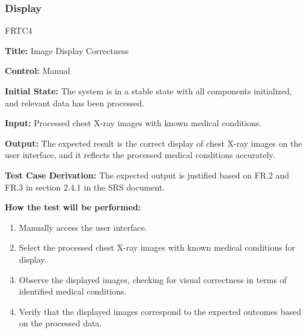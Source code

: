 \documentclass[12pt, titlepage]{article}
\begin{document}
\subsubsection{Display}
\begin{itemize}
    \begin{item}
        FRTC4
        \begin{mdframed}[linewidth=0.5mm]
            \textbf{Title:} Image Display Correctness \par
            \textbf{Control:} Manual \par
            \textbf{Initial State:} The system is in a stable state with all components initialized, and relevant data has been processed. \par
            \textbf{Input:} Processed chest X-ray images with known medical conditions. \par
            \textbf{Output:} The expected result is the correct display of chest X-ray images on the user interface, and it reflects the processed medical conditions accurately. \par
            \textbf{Test Case Derivation:} The expected output is justified based on FR.2 and FR.3 in section 2.4.1 in the SRS document. \par
            \textbf{How the test will be performed:}
            \begin{enumerate}[noitemsep]
                \item Manually access the user interface.
                \item Select the processed chest X-ray images with known medical conditions for display.
                \item Observe the displayed images, checking for visual correctness in terms of identified medical conditions.
                \item Verify that the displayed images correspond to the expected outcomes based on the processed data.
            \end{enumerate}
        \end{mdframed}
    \end{item}


\end{itemize}
\end{document}
